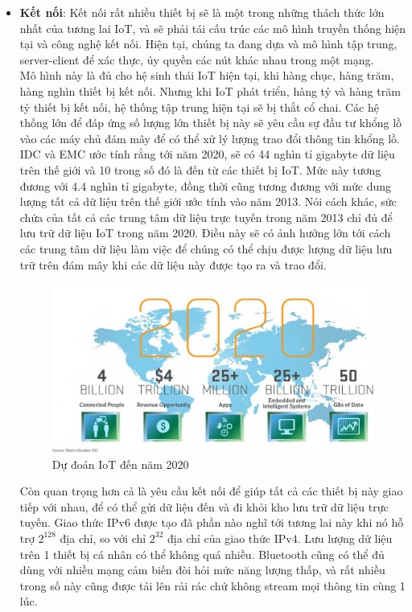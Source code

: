 \begin{itemize}
\item \textbf{ Kết nối}: Kết nối rất nhiều thiết bị sẽ là một trong những thách thức lớn nhất của tương lai IoT, và sẽ phải tái cấu trúc các mô hình truyền thống hiện tại và công nghệ kết nối. Hiện tại, chúng ta đang dựa và mô hình tập trung, server-client để xác thực, ủy quyền các nút khác nhau trong một mạng.\\

Mô hình này là đủ cho hệ sinh thái IoT hiện tại, khi hàng chục, hàng trăm, hàng nghìn thiết bị kết nối. Nhưng khi IoT phát triển, hàng tỷ và hàng trăm tỷ thiết bị kết nối, hệ thống tập trung hiện tại sẽ bị thắt cổ chai. Các hệ thống lớn để đáp ứng số lượng lớn thiết bị này sẽ yêu cầu sự đầu tư khổng lồ vào các máy chủ đám mây để có thể xử lý lượng trao đổi thông tin khổng lồ.\\

IDC và EMC ước tính rằng tới năm 2020, sẽ có 44 nghìn tỉ gigabyte dữ liệu trên thế giới và 10 trong số đó là đến từ các thiết bị IoT. Mức này tương đương với 4.4 nghìn tỉ gigabyte, đồng thời cũng tương đương với mức dung lượng tất cả dữ liệu trên thế giới ước tính vào năm 2013. Nói cách khác, sức chứa của tất cả các trung tâm dữ liệu trực tuyến trong năm 2013 chỉ đủ để lưu trữ dữ liệu IoT trong năm 2020. Điều này sẽ có ảnh hưởng lớn tới cách các trung tâm dữ liệu làm việc để chúng có thể chịu được lượng dữ liệu lưu trữ trên đám mây khi các dữ liệu này được tạo ra và trao đổi.\\

\begin{figure}[htp]
\begin{center}
\includegraphics[scale=1]{image1/IoT.jpg}
\end{center}
\caption{Dự đoán IoT đến năm 2020}
\label{IoT2020}
\end{figure}
\newpage
Còn quan trọng hơn cả là yêu cầu kết nối để giúp tất cả các thiết bị này giao tiếp với nhau, để có thể gửi dữ liệu đến và đi khỏi kho lưu trữ dữ liệu trực tuyến. Giao thức IPv6 được tạo đã phần nào nghĩ tới tương lai này khi nó hỗ trợ $2^{128}$ địa chỉ, so với chỉ $2^{32}$ địa chỉ của giao thức IPv4. Lưu lượng dữ liệu trên 1 thiết bị cá nhân có thể không quá nhiều. Bluetooth cũng có thể đủ dùng với nhiều mạng cảm biến đòi hỏi mức năng lượng thấp, và rất nhiều trong số này cũng được tải lên rải rác chứ không stream mọi thông tin cùng 1 lúc.\\


\end{itemize}

